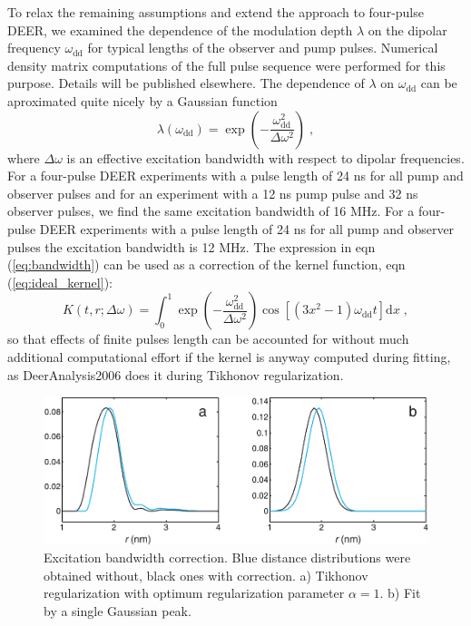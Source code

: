 \documentclass{article}
\begin{document}
To relax the remaining assumptions and extend the approach to four-pulse DEER, we examined the dependence of the modulation depth $\lambda$ on the dipolar frequency $\omega_{\mathrm{dd}}$ for typical lengths of the observer and pump pulses. Numerical density matrix computations of the full pulse sequence were performed for this purpose. Details will be published elsewhere. The dependence of $\lambda$ on $\omega_{\mathrm{dd}}$ can be aproximated quite nicely by a Gaussian function
\begin{equation}
	\lambda \left( \omega_{\mathrm{dd}} \right) = \exp \left( - \frac{\omega_{\mathrm{dd}}^2}{\Delta \omega ^2} \right) \; ,
	\label{eq:bandwidth}
\end{equation}
where $\Delta \omega$ is an effective excitation bandwidth with respect to dipolar frequencies. For a four-pulse DEER experiments with a pulse length of 24 ns for all pump and observer pulses and for an experiment with a 12 ns pump pulse and 32 ns observer pulses, we find the same excitation bandwidth of 16 MHz. For a four-pulse DEER experiments with a pulse length of 24 ns for all pump and observer pulses the excitation bandwidth is 12 MHz. The expression in eqn (\ref{eq:bandwidth}) can be used as a correction of the kernel function, eqn (\ref{eq:ideal_kernel}):
\begin{equation}
	K \left( t, r; \Delta \omega \right) = \int _0 ^1 \exp \left( - \frac{\omega_{\mathrm{dd}}^2}{\Delta \omega ^2} \right) \cos \left[ \left( 3x^2-1 \right) \omega_{\mathrm{dd}} t \right] \mathrm{d}x \; ,
	\label{eq:real_kernel}
\end{equation}
so that effects of finite pulses length can be accounted for without much additional computational effort if the kernel is anyway computed during fitting, as DeerAnalysis2006 does it during Tikhonov regularization. 

\begin{figure}[ht]
 	\begin{center}
  \includegraphics[width=1.0\textwidth]{fig7.pdf}
	\end{center}
	\caption{Excitation bandwidth correction. Blue distance distributions were obtained without, black ones with correction. a) Tikhonov regularization with optimum regularization parameter $\alpha=1$. b) Fit by a single Gaussian peak.}
	\label{fig:manfig7}
\end{figure}
\end{document}
